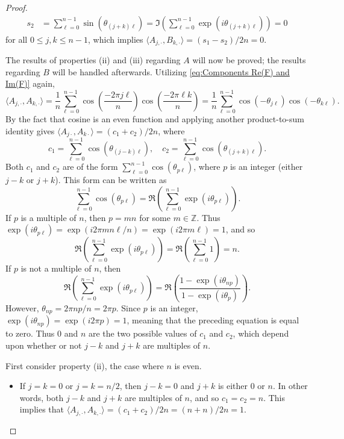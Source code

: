 \begin{proof}
\begin{align*}
s_2 &= \sum_{\ell=0}^{n-1}\sin\left(\theta_{(j+k)\ell}\right) = \Im\left(\sum_{\ell=0}^{n-1}\exp\left(i\theta_{(j+k)\ell}\right)\right) = 0
\end{align*}
for all $0 \leq j,k \leq n-1$, which implies $\langle A_{j,\cdot},B_{k,\cdot}\rangle = (s_1 - s_2)/2n = 0$. \par 
The results of properties (ii) and (iii) regarding $A$ will now be proved; the results regarding $B$ will be handled afterwards. Utilizing \eqref{eq:Components Re(F) and Im(F)} again,
\[\langle A_{j,\cdot}, A_{k,\cdot}\rangle = \frac{1}{n}\sum_{\ell=0}^{n-1}\cos\left(\frac{-2\pi{j\ell}}{n}\right)\cos\left(\frac{-2\pi{\ell{k}}}{n}\right) = \frac{1}{n}\sum_{\ell=0}^{n-1}\cos\left(-\theta_{j\ell}\right)\cos\left(-\theta_{k\ell}\right).\]
By the fact that cosine is an even function and applying another product-to-sum identity gives $\langle A_{j\cdot}, A_{k\cdot}\rangle = (c_1 + c_2)/2n$, where
\begin{equation}
c_1 = \sum_{\ell=0}^{n-1}\cos\left(\theta_{(j-k)\ell}\right), \quad c_2 = \sum_{\ell=0}^{n-1}\cos\left(\theta_{(j+k)\ell}\right).
\label{eq:c_1 and c_2}
\end{equation} 
Both $c_1$ and $c_2$ are of the form $\sum_{\ell=0}^{n-1} \cos(\theta_{p\ell})$, where $p$ is an integer (either $j-k$ or $j+k$). This form can be written as
\[\sum_{\ell=0}^{n-1} \cos\left(\theta_{p\ell}\right) = \Re\left(\sum_{\ell=0}^{n-1} \exp\left(i\theta_{p\ell}\right)\right).\] 
If $p$ is a multiple of $n$, then $p = mn$ for some $m \in \mathbb{Z}$. Thus $\exp(i\theta_{p\ell}) = \exp(i2\pi{mn}\ell/n) = \exp(i2\pi{m\ell}) = 1$, and so
\[\Re\left(\sum_{\ell=0}^{n-1} \exp\left(i\theta_{p\ell}\right)\right) = \Re\left(\sum_{\ell=0}^{n-1} 1\right) = n.\]
If $p$ is not a multiple of $n$, then
\[\Re\left(\sum_{\ell=0}^{n-1} \exp\left(i\theta_{p\ell}\right)\right) = \Re\left(\frac{1-\exp(i\theta_{np})}{1-\exp(i\theta_p)}\right).\]
However, $\theta_{np} = 2\pi{np}/n = 2\pi{p}$. Since $p$ is an integer, $\exp(i\theta_{np})  =\exp(i2\pi{p}) = 1$, meaning that the preceding equation is equal to zero. Thus 0 and $n$ are the two possible values of $c_1$ and $c_2$, which depend upon whether or not $j-k$ and $j+k$ are multiples of $n$. \par 
First consider property (ii), the case where $n$ is even.
\begin{itemize}
\item If $j = k = 0$ or $j = k = n/2$, then $j-k = 0$ and $j+k$ is either 0 or $n$. In other words, both $j-k$ and $j+k$ are multiples of $n$, and so $c_1 = c_2 = n$. This implies that $\langle A_{j,\cdot},A_{k,\cdot} \rangle = (c_1 + c_2)/2n = (n+n)/2n = 1$.

\end{itemize}
\end{proof}
